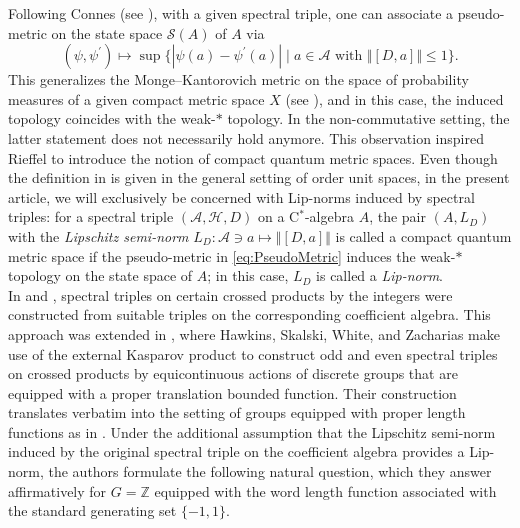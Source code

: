\documentclass[a4paper,11pt,reqno]{amsart}
\numberwithin{equation}{section}
\numberwithin{equation}{section}
\theoremstyle{definition}
\theoremstyle{remark}
\theoremstyle{remark}
\begin{document}
Following Connes (see \cite{Connes89}), with a given spectral triple, one
can associate a pseudo-metric on the state space $\mathcal{S}(A)$
of $A$ via 
\begin{equation}
(\psi,\psi^{\prime})\mapsto\sup\{|\psi(a)-\psi^{\prime}(a) | \mid a\in\mathcal{A}\text{ with }\Vert[D,a]\Vert\leq1\}.\label{eq:PseudoMetric}
\end{equation}
This generalizes the Monge--Kantorovich metric on the space of probability
measures of a given compact metric space $X$ (see \cite{Kantorovitch45}), and
in this case, the induced topology coincides with the weak-$\ast$
topology. In the non-commutative setting, the latter statement does
not necessarily hold anymore. This observation inspired Rieffel to
introduce the notion of compact quantum metric spaces. Even though
the definition in \cite[Definition 2.2]{Rieffel04} is given in the general setting
of order unit spaces, in the present article, we will exclusively
be concerned with Lip-norms induced by spectral triples: for a spectral
triple $(\mathcal{A},\mathcal{H},D)$ on a C$^{\ast}$-algebra $A$,
the pair $(A,L_{D})$ with the \emph{Lipschitz semi-norm} $L_{D}:\mathcal{A} \ni a\mapsto\Vert[D,a]\Vert$
is called a compact quantum metric space if the pseudo-metric in \eqref{eq:PseudoMetric}
induces the weak-$\ast$ topology on the state space of $A$; in this
case, $L_{D}$ is called a \emph{Lip-norm}. \\

In \cite{CMRV08} and \cite{BMR10}, spectral triples on certain crossed products
by the integers were constructed from suitable triples on the corresponding
coefficient algebra. This approach was extended in \cite{HSWZ13},
where Hawkins, Skalski, White, and Zacharias make use of the external
Kasparov product to construct odd and even spectral triples on crossed
products by equicontinuous actions of discrete groups that are equipped
with a proper translation bounded function. Their construction translates
verbatim into the setting of groups equipped with proper length functions
as in \cite{Connes89}. Under the additional assumption that the
Lipschitz semi-norm induced by the original spectral triple on the
coefficient algebra provides a Lip-norm, the authors formulate the following
natural question, which they answer affirmatively for $G=\mathbb{Z}$
equipped with the word length function associated with the standard
generating set $\{-1,1\}$.
\end{document}
